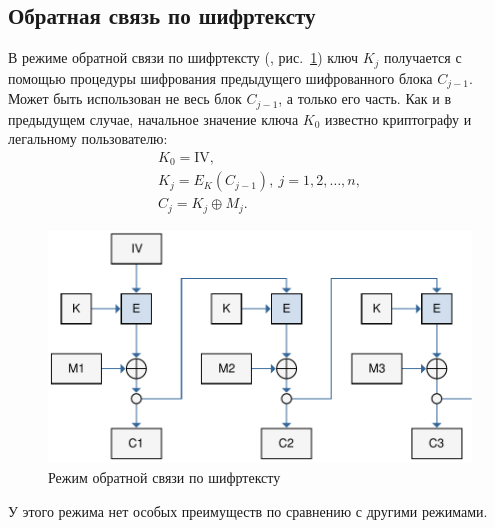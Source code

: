 \subsection{Обратная связь по шифртексту}

В режиме обратной связи по шифртексту (, рис.~\ref{fig:CFB}) ключ $K_j$ получается с помощью процедуры шифрования предыдущего шифрованного блока $C_{j-1}$. Может быть использован не весь блок $C_{j-1}$, а только его часть. Как и в предыдущем случае, начальное значение ключа $K_0$ известно криптографу и легальному пользователю:
\[ \begin{array}{l}
    K_0 = \textrm{IV}, \\
    K_j = E_K(C_{j-1}), ~ j = 1, 2, \dots, n,\\
    C_j = K_j \oplus M_j.
\end{array} \]

\begin{figure}[bt]
	\centering
	\includegraphics[width=1\textwidth]{pic/CFB}
	\caption{Режим обратной связи по шифртексту}
	\label{fig:CFB}
\end{figure}

У этого режима нет особых преимуществ по сравнению с другими режимами.
